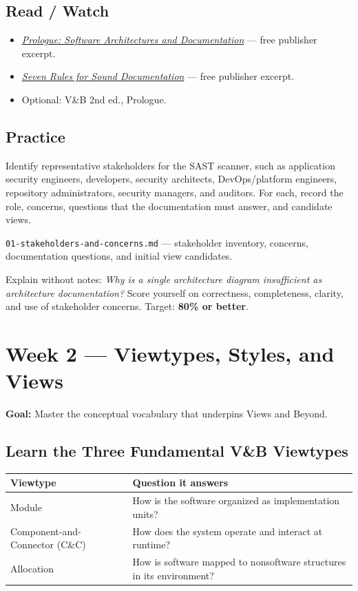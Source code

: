 \documentclass[10pt,letterpaper]{article}
\begin{document}
\subsection{Read / Watch}
\begin{itemize}
  \item \href{https://www.informit.com/articles/article.aspx?p=1641654}{\emph{Prologue: Software Architectures and Documentation}} --- free publisher excerpt.
  \item \href{https://www.informit.com/articles/article.aspx?p=1641654&seqNum=5}{\emph{Seven Rules for Sound Documentation}} --- free publisher excerpt.
  \item Optional: V\&B 2nd ed., Prologue.
\end{itemize}

\subsection{Practice}
Identify representative stakeholders for the SAST scanner, such as application security engineers, developers, security architects, DevOps/platform engineers, repository administrators, security managers, and auditors. For each, record the role, concerns, questions that the documentation must answer, and candidate views.

\begin{deliverablebox}
\texttt{01-stakeholders-and-concerns.md} --- stakeholder inventory, concerns, documentation questions, and initial view candidates.
\end{deliverablebox}

\begin{masterybox}
Explain without notes: \emph{Why is a single architecture diagram insufficient as architecture documentation?} Score yourself on correctness, completeness, clarity, and use of stakeholder concerns. Target: \textbf{80\% or better}.
\end{masterybox}

\section{Week 2 --- Viewtypes, Styles, and Views}

\textbf{Goal:} Master the conceptual vocabulary that underpins Views and Beyond.

\subsection{Learn the Three Fundamental V\&B Viewtypes}
\begin{tabularx}{\textwidth}{@{}P{0.26\textwidth}Y@{}}
\toprule
{}\textbf{Viewtype} & \textbf{Question it answers} \\
\midrule
Module & How is the software organized as implementation units? \\
Component-and-Connector (C\&C) & How does the system operate and interact at runtime? \\
Allocation & How is software mapped to nonsoftware structures in its environment? \\
\bottomrule
\end{tabularx}
\end{document}
